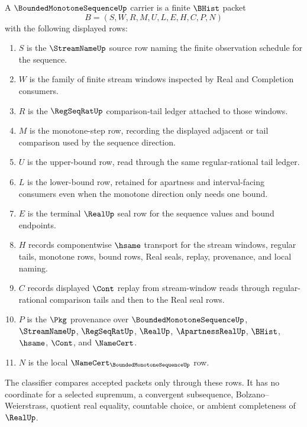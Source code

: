 \begin{definition}
\label{def:bounded-monotone-sequence-carrier}
A $\BoundedMonotoneSequenceUp$ carrier is a finite $\BHist$ packet
$$
B=(S,W,R,M,U,L,E,H,C,P,N)
$$
with the following displayed rows:
\begin{enumerate}
\item $S$ is the $\StreamNameUp$ source row naming the finite observation schedule for the sequence.
\item $W$ is the family of finite stream windows inspected by Real and Completion consumers.
\item $R$ is the $\RegSeqRatUp$ comparison-tail ledger attached to those windows.
\item $M$ is the monotone-step row, recording the displayed adjacent or tail comparison used by the sequence direction.
\item $U$ is the upper-bound row, read through the same regular-rational tail ledger.
\item $L$ is the lower-bound row, retained for apartness and interval-facing consumers even when the monotone direction only needs one bound.
\item $E$ is the terminal $\RealUp$ seal row for the sequence values and bound endpoints.
\item $H$ records componentwise $\hsame$ transport for the stream windows, regular tails, monotone rows, bound rows, Real seals, replay, provenance, and local naming.
\item $C$ records displayed $\Cont$ replay from stream-window reads through regular-rational comparison tails and then to the Real seal rows.
\item $P$ is the $\Pkg$ provenance over $\BoundedMonotoneSequenceUp$, $\StreamNameUp$, $\RegSeqRatUp$, $\RealUp$, $\ApartnessRealUp$, $\BHist$, $\hsame$, $\Cont$, and $\NameCert$.
\item $N$ is the local $\NameCert_{\BoundedMonotoneSequenceUp}$ row.
\end{enumerate}
The classifier compares accepted packets only through these rows. It has no coordinate for a selected supremum, a convergent subsequence, Bolzano--Weierstrass, quotient real equality, countable choice, or ambient completeness of $\RealUp$.
\end{definition}


